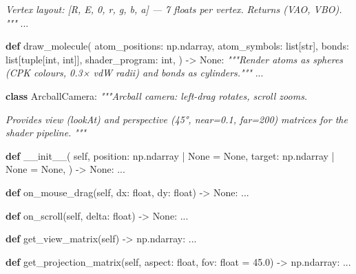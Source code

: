 \documentclass[
  11pt,
]{report}
\newenvironment{Shaded}{}{}
\newcommand{\BuiltInTok}[1]{\textcolor[rgb]{0.00,0.50,0.00}{#1}}
\newcommand{\CommentTok}[1]{\textcolor[rgb]{0.38,0.63,0.69}{\textit{#1}}}
\newcommand{\FloatTok}[1]{\textcolor[rgb]{0.25,0.63,0.44}{#1}}
\newcommand{\FunctionTok}[1]{\textcolor[rgb]{0.02,0.16,0.49}{#1}}
\newcommand{\KeywordTok}[1]{\textcolor[rgb]{0.00,0.44,0.13}{\textbf{#1}}}
\newcommand{\NormalTok}[1]{#1}
\newcommand{\OperatorTok}[1]{\textcolor[rgb]{0.40,0.40,0.40}{#1}}
\newcommand{\VariableTok}[1]{\textcolor[rgb]{0.10,0.09,0.49}{#1}}
\begin{document}
\begin{Shaded}
\begin{Highlighting}[]
\CommentTok{    Vertex layout: [R, E, 0, r, g, b, a] — 7 floats per vertex.}
\CommentTok{    Returns (VAO, VBO).}
\CommentTok{    """}
\NormalTok{    ...}


\KeywordTok{def}\NormalTok{ draw\_molecule(}
\NormalTok{    atom\_positions: np.ndarray,}
\NormalTok{    atom\_symbols: }\BuiltInTok{list}\NormalTok{[}\BuiltInTok{str}\NormalTok{],}
\NormalTok{    bonds: }\BuiltInTok{list}\NormalTok{[}\BuiltInTok{tuple}\NormalTok{[}\BuiltInTok{int}\NormalTok{, }\BuiltInTok{int}\NormalTok{]],}
\NormalTok{    shader\_program: }\BuiltInTok{int}\NormalTok{,}
\NormalTok{) }\OperatorTok{{-}\textgreater{}} \VariableTok{None}\NormalTok{:}
    \CommentTok{"""Render atoms as spheres (CPK colours, 0.3× vdW radii) and bonds as cylinders."""}
\NormalTok{    ...}


\KeywordTok{class}\NormalTok{ ArcballCamera:}
    \CommentTok{"""Arcball camera: left{-}drag rotates, scroll zooms.}

\CommentTok{    Provides view (lookAt) and perspective (45°, near=0.1, far=200)}
\CommentTok{    matrices for the shader pipeline.}
\CommentTok{    """}

    \KeywordTok{def} \FunctionTok{\_\_init\_\_}\NormalTok{(}
        \VariableTok{self}\NormalTok{,}
\NormalTok{        position: np.ndarray }\OperatorTok{|} \VariableTok{None} \OperatorTok{=} \VariableTok{None}\NormalTok{,}
\NormalTok{        target: np.ndarray }\OperatorTok{|} \VariableTok{None} \OperatorTok{=} \VariableTok{None}\NormalTok{,}
\NormalTok{    ) }\OperatorTok{{-}\textgreater{}} \VariableTok{None}\NormalTok{: ...}

    \KeywordTok{def}\NormalTok{ on\_mouse\_drag(}\VariableTok{self}\NormalTok{, dx: }\BuiltInTok{float}\NormalTok{, dy: }\BuiltInTok{float}\NormalTok{) }\OperatorTok{{-}\textgreater{}} \VariableTok{None}\NormalTok{: ...}

    \KeywordTok{def}\NormalTok{ on\_scroll(}\VariableTok{self}\NormalTok{, delta: }\BuiltInTok{float}\NormalTok{) }\OperatorTok{{-}\textgreater{}} \VariableTok{None}\NormalTok{: ...}

    \KeywordTok{def}\NormalTok{ get\_view\_matrix(}\VariableTok{self}\NormalTok{) }\OperatorTok{{-}\textgreater{}}\NormalTok{ np.ndarray: ...}

    \KeywordTok{def}\NormalTok{ get\_projection\_matrix(}\VariableTok{self}\NormalTok{, aspect: }\BuiltInTok{float}\NormalTok{, fov: }\BuiltInTok{float} \OperatorTok{=} \FloatTok{45.0}\NormalTok{) }\OperatorTok{{-}\textgreater{}}\NormalTok{ np.ndarray: ...}
\end{Highlighting}
\end{Shaded}
\end{document}
